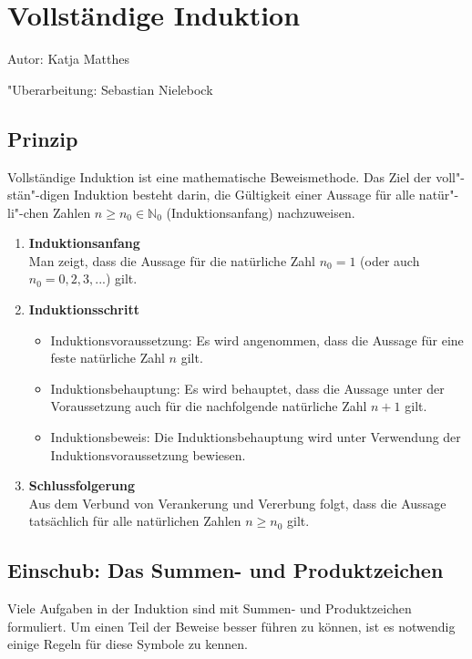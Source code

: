 \chapter{Vollständige Induktion}
\label{Induktion}
Autor: Katja Matthes

\noindent "Uberarbeitung: Sebastian Nielebock
\section{Prinzip}
Vollständige Induktion ist eine mathematische Beweismethode. Das Ziel der voll"-stän"-digen Induktion besteht darin, die Gültigkeit einer Aussage für alle natür"-li"-chen Zahlen $ n \geq n_{0} \in \mathbb{N}_{0} $ (Induktionsanfang) nachzuweisen.
\begin{enumerate}
	\item \textbf{Induktionsanfang} \\
	Man zeigt, dass die Aussage für die natürliche Zahl $ n_{0} = 1 $ (oder auch $ n_{0} = 0,2,3, ... $) gilt.
	\item \textbf{Induktionsschritt}
		\begin{itemize}
			\item Induktionsvoraussetzung:
			Es wird angenommen, dass die Aussage für eine feste natürliche Zahl $ n $ gilt.
			\item Induktionsbehauptung: Es wird behauptet, dass die Aussage unter der Voraussetzung auch für die nachfolgende natürliche Zahl $ n+1 $ gilt.
			\item Induktionsbeweis: Die Induktionsbehauptung wird unter Verwendung der Induktionsvoraussetzung bewiesen.
		\end{itemize}
	\item \textbf{Schlussfolgerung} \\
	Aus dem Verbund von Verankerung und Vererbung folgt, dass die Aussage tatsächlich für alle natürlichen Zahlen $ n \geq n_{0} $ gilt.
\end{enumerate}
\section{Einschub: Das Summen- und Produktzeichen}
Viele Aufgaben in der Induktion sind mit Summen- und Produktzeichen formuliert. Um einen Teil der Beweise besser führen zu können, ist es notwendig einige Regeln für diese Symbole zu kennen.

